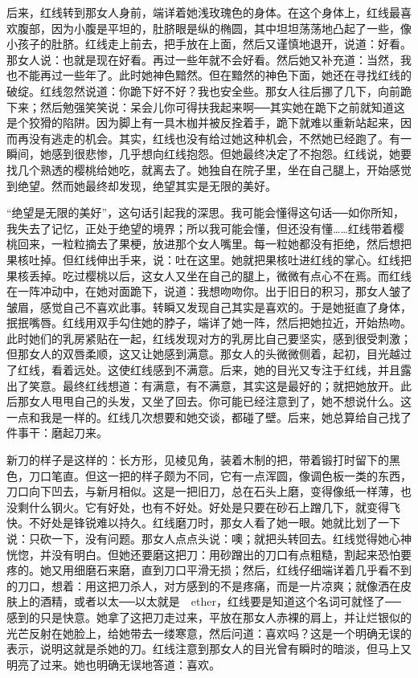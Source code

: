 后来，红线转到那女人身前，端详着她浅玫瑰色的身体。在这个身体上，红线最喜欢腹部，因为小腹是平坦的，肚脐眼是纵的椭圆，其中坦坦荡荡地凸起了一些，像小孩子的肚脐。红线走上前去，把手放在上面，然后又谨慎地退开，说道：好看。那女人说：也就是现在好看。再过一些年就不会好看。然后她又补充道：当然，我也不能再过一些年了。此时她神色黯然。但在黯然的神色下面，她还在寻找红线的破绽。红线忽然说道：你跪下好不好？我也安全些。那女人往后挪了几下，向前跪下来；然后勉强笑笑说：呆会儿你可得扶我起来啊──其实她在跪下之前就知道这是个狡猾的陷阱。因为脚上有一具木枷并被反拴着手，跪下就难以重新站起来，因而再没有逃走的机会。其实，红线也没有给过她这种机会，不然她已经跑了。有一瞬间，她感到很悲惨，几乎想向红线抱怨。但她最终决定了不抱怨。红线说，她要找几个熟透的樱桃给她吃，就离去了。她独自在院子里，坐在自己腿上，开始感觉到绝望。然而她最终却发现，绝望其实是无限的美好。 

“绝望是无限的美好”，这句话引起我的深思。我可能会懂得这句话──如你所知，我失去了记忆，正处于绝望的境界；所以我可能会懂，但还没有懂……红线带着樱桃回来，一粒粒摘去了果梗，放进那个女人嘴里。每一粒她都没有拒绝，然后想把果核吐掉。但红线伸出手来，说：吐在这里。她就把果核吐进红线的掌心。红线把果核丢掉。吃过樱桃以后，这女人又坐在自己的腿上，微微有点心不在焉。而红线在一阵冲动中，在她对面跪下，说道：我想吻吻你。出于旧日的积习，那女人皱了皱眉，感觉自己不喜欢此事。转瞬又发现自己其实是喜欢的。于是她挺直了身体，抿抿嘴唇。红线用双手勾住她的脖子，端详了她一阵，然后把她拉近，开始热吻。此时她们的乳房紧贴在一起，红线发现对方的乳房比自己要坚实，感到很受刺激；但那女人的双唇柔顺，这又让她感到满意。那女人的头微微侧着，起初，目光越过了红线，看着远处。这使红线感到不满意。后来，她的目光又专注于红线，并且露出了笑意。最终红线想道：有满意，有不满意，其实这是最好的；就把她放开。此后那女人甩甩自己的头发，又坐了回去。你可能已经注意到了，她不想说什么。这一点和我是一样的。红线几次想要和她交谈，都碰了壁。后来，她总算给自己找了件事干：磨起刀来。 

新刀的样子是这样的：长方形，见棱见角，装着木制的把，带着锻打时留下的黑色，刀口笔直。但这一把的样子颇为不同，它有一点浑圆，像调色板一类的东西，刀口向下凹去，与新月相似。这是一把旧刀，总在石头上磨，变得像纸一样薄，也没剩什么钢火。它有好处，也有不好处。好处是只要在砂石上蹭几下，就变得飞快。不好处是锋锐难以持久。红线磨刀时，那女人看了她一眼。她就比划了一下说：只砍一下，没有问题。那女人点点头说：噢；就把头转回去。红线觉得她心神恍惚，并没有明白。但她还要磨这把刀：用砂蹭出的刀口有点粗糙，割起来恐怕要疼的。她又用细磨石来磨，直到刀口平滑无损；然后，红线仔细端详着几乎看不到的刀口，想着：用这把刀杀人，对方感到的不是疼痛，而是一片凉爽；就像洒在皮肤上的酒精，或者以太──以太就是　ether，红线要是知道这个名词可就怪了──感到的只是快意。她拿了这把刀走过来，平放在那女人赤裸的肩上，并让烂银似的光芒反射在她脸上，给她带去一缕寒意，然后问道：喜欢吗？这是一个明确无误的表示，说明这就是杀她的刀。红线注意到那女人的目光曾有瞬时的暗淡，但马上又明亮了过来。她也明确无误地答道：喜欢。 

